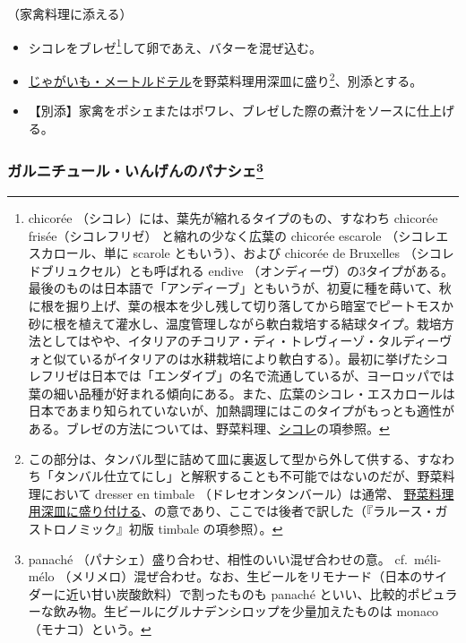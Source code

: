 \begin{recette}


（家禽料理に添える）

\begin{itemize}
\item
  シコレをブレゼ\footnote{chicorée
    （シコレ）には、葉先が縮れるタイプのもの、すなわち chicorée
    frisée（シコレフリゼ） と縮れの少なく広葉の chicorée escarole
    （シコレエスカロール、単に scarole ともいう）、および chicorée de
    Bruxelles （シコレドブリュクセル）とも呼ばれる endive
    （オンディーヴ）の3タイプがある。最後のものは日本語で「アンディーブ」ともいうが、初夏に種を蒔いて、秋に根を掘り上げ、葉の根本を少し残して切り落してから暗室でピートモスか砂に根を植えて灌水し、温度管理しながら軟白栽培する結球タイプ。栽培方法としてはやや、イタリアのチコリア・ディ・トレヴィーゾ・タルディーヴォと似ているがイタリアのは水耕栽培により軟白する）。最初に挙げたシコレフリゼは日本では「エンダイブ」の名で流通しているが、ヨーロッパでは葉の細い品種が好まれる傾向にある。また、広葉のシコレ・エスカロールは日本であまり知られていないが、加熱調理にはこのタイプがもっとも適性がある。ブレゼの方法については、野菜料理、\protect\hyperlink{chicoree}{シコレ}の項参照。}して卵であえ、バターを混ぜ込む。
\item
  \protect\hyperlink{pommes-de-terre-maitre-d-hotel}{じゃがいも・メートルドテル}を野菜料理用深皿に盛り\footnote{この部分は、タンバル型に詰めて皿に裏返して型から外して供する、すなわち「タンバル仕立てにし」と解釈することも不可能ではないのだが、野菜料理において
    dresser en timbale （ドレセオンタンバール）は通常、
    \ul{野菜料理用深皿に盛り付ける}、の意であり、ここでは後者で訳した（『ラルース・ガストロノミック』初版
    timbale の項参照）。}、別添とする。
\item
  【別添】家禽をポシェまたはポワレ、ブレゼした際の煮汁をソースに仕上げる。
\end{itemize}

\atoaki{}

\hypertarget{garniture-de-haricots-panaches}{%
\subsubsection[ガルニチュール・いんげんのパナシェ]{\texorpdfstring{ガルニチュール・いんげんのパナシェ\footnote{panaché
  （パナシェ）盛り合わせ、相性のいい混ぜ合わせの意。 cf.~méli-mélo
  （メリメロ）混ぜ合わせ。なお、生ビールをリモナード（日本のサイダーに近い甘い炭酸飲料）で割ったものも
  panaché
  といい、比較的ポピュラーな飲み物。生ビールにグルナデンシロップを少量加えたものは
  monaco （モナコ）という。}}{ガルニチュール・いんげんのパナシェ}}\label{garniture-de-haricots-panaches}}


\end{recette}
